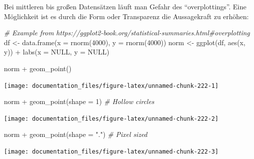 \documentclass[
]{article}
\newenvironment{Shaded}{\begin{snugshade}}{\end{snugshade}}
\newcommand{\AttributeTok}[1]{\textcolor[rgb]{0.77,0.63,0.00}{#1}}
\newcommand{\CommentTok}[1]{\textcolor[rgb]{0.56,0.35,0.01}{\textit{#1}}}
\newcommand{\ConstantTok}[1]{\textcolor[rgb]{0.00,0.00,0.00}{#1}}
\newcommand{\DecValTok}[1]{\textcolor[rgb]{0.00,0.00,0.81}{#1}}
\newcommand{\FunctionTok}[1]{\textcolor[rgb]{0.00,0.00,0.00}{#1}}
\newcommand{\NormalTok}[1]{#1}
\newcommand{\OtherTok}[1]{\textcolor[rgb]{0.56,0.35,0.01}{#1}}
\newcommand{\SpecialCharTok}[1]{\textcolor[rgb]{0.00,0.00,0.00}{#1}}
\newcommand{\StringTok}[1]{\textcolor[rgb]{0.31,0.60,0.02}{#1}}
\begin{document}
Bei mittleren bis großen Datensätzen läuft man Gefahr des ``overplottings''. Eine Möglichkeit ist es durch die Form oder Transparenz die Aussagekraft zu erhöhen:

\begin{Shaded}
\begin{Highlighting}[]
\CommentTok{\# Example from https://ggplot2{-}book.org/statistical{-}summaries.html\#overplotting}
\NormalTok{df }\OtherTok{\textless{}{-}} \FunctionTok{data.frame}\NormalTok{(}\AttributeTok{x =} \FunctionTok{rnorm}\NormalTok{(}\DecValTok{4000}\NormalTok{), }\AttributeTok{y =} \FunctionTok{rnorm}\NormalTok{(}\DecValTok{4000}\NormalTok{))}
\NormalTok{norm }\OtherTok{\textless{}{-}} \FunctionTok{ggplot}\NormalTok{(df, }\FunctionTok{aes}\NormalTok{(x, y)) }\SpecialCharTok{+} 
  \FunctionTok{labs}\NormalTok{(}\AttributeTok{x =} \ConstantTok{NULL}\NormalTok{, }\AttributeTok{y =} \ConstantTok{NULL}\NormalTok{) }

\NormalTok{norm }\SpecialCharTok{+} \FunctionTok{geom\_point}\NormalTok{()}
\end{Highlighting}
\end{Shaded}

\begin{center}\texttt{[image: documentation\_files/figure-latex/unnamed-chunk-222-1]} \end{center}

\begin{Shaded}
\begin{Highlighting}[]
\NormalTok{norm }\SpecialCharTok{+} \FunctionTok{geom\_point}\NormalTok{(}\AttributeTok{shape =} \DecValTok{1}\NormalTok{) }\CommentTok{\# Hollow circles}
\end{Highlighting}
\end{Shaded}

\begin{center}\texttt{[image: documentation\_files/figure-latex/unnamed-chunk-222-2]} \end{center}

\begin{Shaded}
\begin{Highlighting}[]
\NormalTok{norm }\SpecialCharTok{+} \FunctionTok{geom\_point}\NormalTok{(}\AttributeTok{shape =} \StringTok{"."}\NormalTok{) }\CommentTok{\# Pixel sized}
\end{Highlighting}
\end{Shaded}

\begin{center}\texttt{[image: documentation\_files/figure-latex/unnamed-chunk-222-3]} \end{center}
\end{document}

